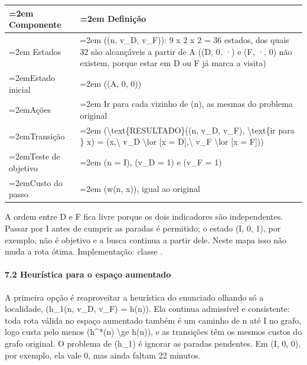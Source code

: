 \documentclass[12pt, a4paper]{article}
\DeclareRobustCommand{\texttt}[1]{\breakabletexttt{#1}}
\begin{document}
\begingroup
\setlength{\tabcolsep}{4.0pt}
\begin{longtable}{@{}>{\raggedright\hyphenpenalty=30\tolerance=999\emergencystretch=2em\arraybackslash}p{3.90cm}>{\raggedright\hyphenpenalty=30\tolerance=999\emergencystretch=2em\arraybackslash}p{11.10cm}@{}}
\toprule\noalign{}
Componente & Definição \\
\midrule\noalign{}
\endhead
\bottomrule\noalign{}
\endlastfoot
Estados & ((n, v\_D, v\_F\allowbreak )): 9 x 2 x 2 = 36 estados, dos quais 32 são al\-can\-çá\-veis a partir de A ((D, 0, ·) e (F, ·, 0) não existem, porque estar em D ou F já marca a visita\allowbreak ) \\
Estado inicial & ((A, 0, 0)) \\
Ações & Ir para cada vizinho de (n\allowbreak ), as mesmas do problema original \\
Transição & (\textbackslash text\{RESULTADO\}((n, v\_D, v\_F\allowbreak ), \textbackslash text\{ir para \} x\allowbreak ) = (x,\textbackslash{} v\_D \textbackslash lor {[}x = D{]},\textbackslash{} v\_F \textbackslash lor {[}x = F{]})) \\
Teste de objetivo & (n = I\allowbreak ), (v\_D = 1) e (v\_F = 1) \\
Custo do passo & (w(n, x\allowbreak )), igual ao original \\
\end{longtable}
\endgroup

A ordem entre D e F fica livre porque os dois indicadores são independentes. Passar por I antes de cumprir as paradas é permitido; o estado (I, 0, 1), por exemplo, não é objetivo e a busca continua a partir dele. Neste mapa isso não muda a rota ótima. Implementação: classe \texttt{ProblemaRotaDF}.

\paragraph{7.2 Heurística para o espaço aumentado}\label{72-heuruxedstica-para-o-espauxe7o-aumentado}

A primeira opção é reaproveitar a heurística do enunciado olhando só a localidade, (h\_1(n, v\_D, v\_F) = h(n)). Ela continua admissível e consistente: toda rota válida no espaço aumentado também é um caminho de n até I no grafo, logo custa pelo menos (h\^{}*(n) \textbackslash ge h(n)), e as transições têm os mesmos custos do grafo original. O problema de (h\_1) é ignorar as paradas pendentes. Em (I, 0, 0), por exemplo, ela vale 0, mas ainda faltam 22 minutos.
\end{document}
